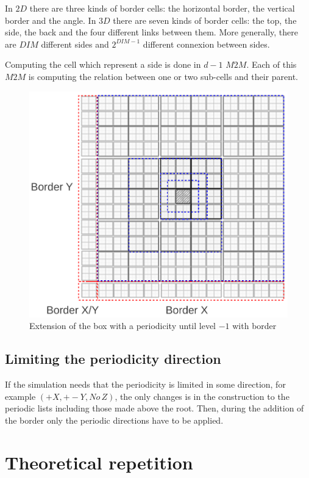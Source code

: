 \documentclass[12pt]{article} %
\begin{document}
In $2D$ there are three kinds of border cells: the horizontal border, the vertical border and the angle.
In $3D$ there are seven kinds of border cells: the top, the side, the back and the four different links between them.
More generally, there are $DIM$ different sides and $2^{DIM-1}$ different connexion between sides.

Computing the cell which represent a side is done in $d-1$ $M2M$.
Each of this $M2M$ is computing the relation between one or two sub-cells and their parent.

\begin{figure}[h]
\centering
\includegraphics[scale=0.45]{Images/Border}
\caption{Extension of the box with a periodicity until level $-1$ with border}
\end{figure}

\subsection{Limiting the periodicity direction}

If the simulation needs that the periodicity is limited in some direction, for example $(+X,+-Y,No \, Z)$, the only changes is in the construction to the periodic lists including those made above the root.
Then, during the addition of the border only the periodic directions have to be applied.

\section{Theoretical repetition}
\end{document}

